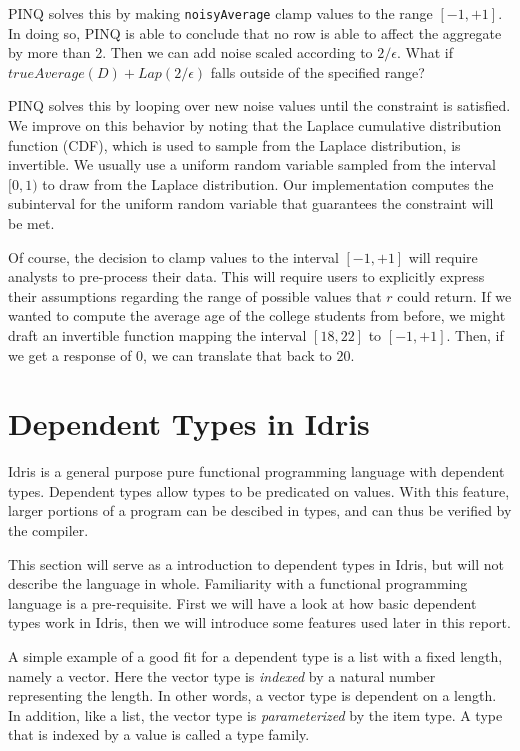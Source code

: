 \documentclass[12pt]{article}
\begin{document}
PINQ solves this by making \texttt{noisyAverage} clamp values to the range $[-1,+1]$.
In doing so, PINQ is able to conclude that no row is able to affect the aggregate by more than 2.
Then we can add noise scaled according to $2/\epsilon$.
What if $trueAverage(D) + Lap(2/\epsilon)$ falls outside of the specified range?

PINQ solves this by looping over new noise values until the constraint is satisfied.
We improve on this behavior by noting that the Laplace cumulative distribution function (CDF), which is used to sample from the Laplace distribution, is invertible.
We usually use a uniform random variable sampled from the interval $[0,1)$ to draw from the Laplace distribution.
Our implementation computes the subinterval for the uniform random variable that guarantees the constraint will be met.


Of course, the decision to clamp values to the interval $[-1,+1]$ will require analysts to pre-process their data.
This will require users to explicitly express their assumptions regarding the range of possible values that $r$ could return.
If we wanted to compute the average age of the college students from before, we might draft an invertible function mapping the interval $[18,22]$ to $[-1,+1]$.
Then, if we get a response of $0$, we can translate that back to $20$.


\section{Dependent Types in Idris}\label{sec:dependent_types_in_idris}

Idris is a general purpose pure functional programming language with dependent types.
Dependent types allow types to be predicated on values.
With this feature, larger portions of a program can be descibed in types, and can thus be verified by the compiler.

This section will serve as a introduction to dependent types in Idris, but will not describe the language in whole.
Familiarity with a functional programming language is a pre-requisite.
First we will have a look at how basic dependent types work in Idris, then we will introduce some features used later in this report.

A simple example of a good fit for a dependent type is a list with a fixed length, namely a vector.
Here the vector type is \textit{indexed} by a natural number representing the length. 
In other words, a vector type is dependent on a length. 
In addition, like a list, the vector type is \textit{parameterized} by the item type.
A type that is indexed by a value is called a type family.
\end{document}
